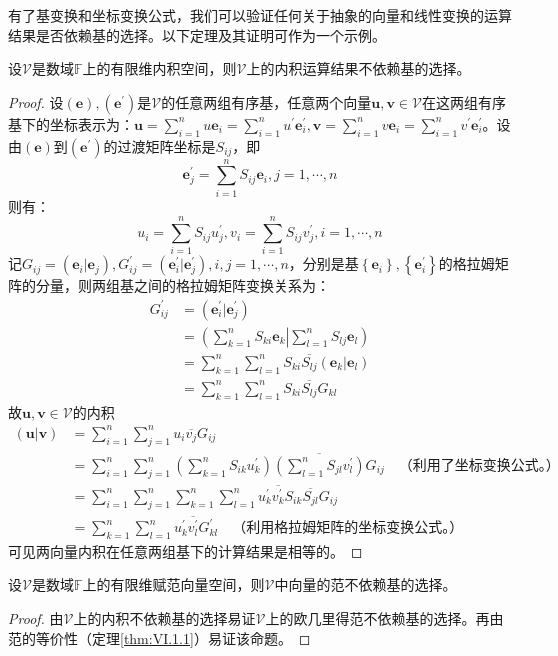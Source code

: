 \documentclass[main.tex]{subfiles}
\begin{document}
有了基变换和坐标变换公式，我们可以验证任何关于抽象的向量和线性变换的运算结果是否依赖基的选择。以下定理及其证明可作为一个示例。

\begin{theorem}\label{thm:II.2.23}
    设$\mathcal{V}$是数域$\mathbb{F}$上的有限维内积空间，则$\mathcal{V}$上的内积运算结果不依赖基的选择。
\end{theorem}
\begin{proof}
    设$\left(\mathbf{e}\right),\left(\mathbf{e}^\prime\right)$是$\mathcal{V}$的任意两组有序基，任意两个向量$\mathbf{u},\mathbf{v}\in\mathcal{V}$在这两组有序基下的坐标表示为：$\mathbf{u}=\sum_{i=1}^nu\mathbf{e}_i=\sum_{i=1}^nu^\prime\mathbf{e}^\prime_i,\mathbf{v}=\sum_{i=1}^nv\mathbf{e}_i=\sum_{i=1}^nv^\prime\mathbf{e}^\prime_i$。设由$\left(\mathbf{e}\right)$到$\left(\mathbf{e}^\prime\right)$的过渡矩阵坐标是$S_{ij}$，即
    \[
        \mathbf{e}_j^\prime=\sum_{i=1}^nS_{ij}\mathbf{e}_i,j=1,\cdots,n\]
    则有：
    \[u_i=\sum_{i=1}^nS_{ij}u^\prime_j,v_i=\sum_{i=1}^nS_{ij}v^\prime_j,i=1,\cdots,n\]
    记$G_{ij}=\left(\mathbf{e}_i|\mathbf{e}_j\right),G_{ij}^\prime=\left(\mathbf{e}^\prime_i|\mathbf{e}^\prime_j\right),i,j=1,\cdots,n$，分别是基$\left\{\mathbf{e}_i\right\},\left\{\mathbf{e}^\prime_i\right\}$的格拉姆矩阵的分量，则两组基之间的格拉姆矩阵变换关系为：
    \begin{align*}
        G^\prime_{ij} & =\left(\mathbf{e}^\prime_i|\mathbf{e}^\prime_j\right)                                     \\
                      & =\left(\sum_{k=1}^n S_{ki}\mathbf{e}_k\right|\left.\sum_{l=1}^n S_{lj}\mathbf{e}_l\right) \\
                      & =\sum_{k=1}^n\sum_{l=1}^nS_{ki}\overline{S_{lj}}\left(\mathbf{e}_k|\mathbf{e}_l\right)    \\
                      & =\sum_{k=1}^n\sum_{l=1}^nS_{ki}\overline{S_{lj}}G_{kl}
    \end{align*}
    故$\mathbf{u},\mathbf{v}\in\mathcal{V}$的内积
    \begin{align*}
        \left(\mathbf{u}|\mathbf{v}\right) & =\sum_{i=1}^n\sum_{j=1}^nu_i\overline{v_j}G_{ij}                                                                                                     \\
                                           & =\sum_{i=1}^n\sum_{j=1}^n\left(\sum_{k=1}^nS_{ik}u_k^\prime\right)\overline{\left(\sum_{l=1}^nS_{jl}v_l^\prime\right)}G_{ij}\quad\text{（利用了坐标变换公式。）} \\
                                           & =\sum_{i=1}^n\sum_{j=1}^n\sum_{k=1}^n\sum_{l=1}^nu_k^\prime\overline{v_k^\prime}S_{ik}\overline{S_{jl}}G_{ij}                                        \\
                                           & =\sum_{k=1}^n\sum_{l=1}^nu_k^\prime\overline{v_l^\prime}G_{kl}^\prime\quad\text{（利用格拉姆矩阵的坐标变换公式。）}
    \end{align*}
    可见两向量内积在任意两组基下的计算结果是相等的。
\end{proof}
\begin{corollary}
    设$\mathcal{V}$是数域$\mathbb{F}$上的有限维赋范向量空间，则$\mathcal{V}$中向量的范不依赖基的选择。
\end{corollary}
\begin{proof}
    由$\mathcal{V}$上的内积不依赖基的选择易证$\mathcal{V}$上的欧几里得范不依赖基的选择。再由范的等价性（定理\ref{thm:VI.1.1}）易证该命题。
\end{proof}
\end{document}
